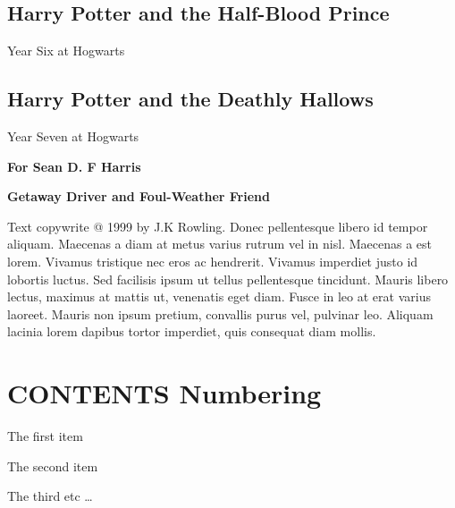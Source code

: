 \documentclass{article}%
\begin{document}
%
\subsection*{Harry Potter and the Half{-}Blood Prince}%
\label{subsec:Harry Potter and the Half{-}Blood Prince}%
Year Six at Hogwarts

%
\subsection*{Harry Potter and the Deathly Hallows}%
\label{subsec:Harry Potter and the Deathly Hallows}%
Year Seven at Hogwarts

%
\newpage%
\begin{Large}%
\textbf{For Sean D. F Harris \newline%
 \newline%
}%
\end{Large}%
\begin{Large}%
\textbf{Getaway Driver and Foul{-}Weather Friend \newline%
}%
\end{Large}%
\begin{small}%
Text copywrite @ 1999 by J.K Rowling.\newline%
	Donec pellentesque libero id tempor aliquam. Maecenas a diam at metus varius\newline%
			rutrum vel in nisl. Maecenas a est lorem. Vivamus tristique nec eros ac\newline%
			hendrerit. Vivamus imperdiet justo id lobortis luctus. Sed facilisis ipsum ut\newline%
			tellus pellentesque tincidunt. Mauris libero lectus, maximus at mattis ut,\newline%
			venenatis eget diam. Fusce in leo at erat varius laoreet. Mauris non ipsum\newline%
			pretium, convallis purus vel, pulvinar leo. Aliquam lacinia lorem dapibus\newline%
			tortor imperdiet, quis consequat diam mollis.%
\end{small}%
\newpage%
\centering%
\section*{CONTENTS Numbering}%
\label{sec:CONTENTS Numbering}%
\begin{description}%
\centering%
\item[ONE]%
The first item%
\item[TWO]%
The second item%
\item[THREE]%
The third etc \ldots%
\end{description}
\end{document}
